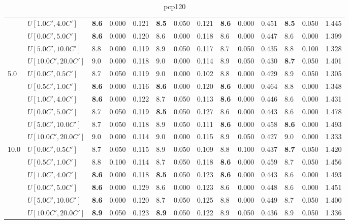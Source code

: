 \begin{table}[h]
{\begin{tabular}{|l|l||l|l|l||l|l|l||l|l|l||l|l|l|}
       & $U[1.0C',4.0C']$ & \textbf{8.6} & 0.000 & 0.121 & \textbf{8.5} & 0.050 & 0.121 & \textbf{8.6} & 0.000 & 0.451 & \textbf{8.5} & 0.050 & 1.445 \\
       & $U[0.0C',5.0C']$ & \textbf{8.6} & 0.000 & 0.120 & 8.6 & 0.000 & 0.118 & 8.6 & 0.000 & 0.447 & 8.6 & 0.000 & 1.399 \\
       & $U[5.0C',10.0C']$ & 8.8 & 0.000 & 0.119 & 8.9 & 0.050 & 0.117 & 8.7 & 0.050 & 0.435 & 8.8 & 0.100 & 1.328 \\
       & $U[10.0C',20.0C']$ & 9.0 & 0.000 & 0.118 & 9.0 & 0.000 & 0.114 & 8.9 & 0.050 & 0.430 & \textbf{8.7} & 0.050 & 1.401 \\
      \hline\hline
      \multirow{6}{*}{5.0} & $U[0.0C',0.5C']$ & 8.7 & 0.050 & 0.119 & 9.0 & 0.000 & 0.102 & 8.8 & 0.000 & 0.429 & 8.9 & 0.050 & 1.305 \\
       & $U[0.5C',1.0C']$ & \textbf{8.6} & 0.000 & 0.116 & \textbf{8.6} & 0.000 & 0.120 & \textbf{8.6} & 0.000 & 0.464 & 8.8 & 0.000 & 1.348 \\
       & $U[1.0C',4.0C']$ & \textbf{8.6} & 0.000 & 0.122 & 8.7 & 0.050 & 0.113 & \textbf{8.6} & 0.000 & 0.446 & 8.6 & 0.000 & 1.431 \\
       & $U[0.0C',5.0C']$ & 8.7 & 0.050 & 0.119 & \textbf{8.5} & 0.050 & 0.127 & 8.6 & 0.000 & 0.443 & 8.6 & 0.000 & 1.478 \\
       & $U[5.0C',10.0C']$ & 8.7 & 0.050 & 0.118 & 8.9 & 0.050 & 0.111 & \textbf{8.6} & 0.000 & 0.458 & \textbf{8.6} & 0.000 & 1.493 \\
       & $U[10.0C',20.0C']$ & 9.0 & 0.000 & 0.114 & 9.0 & 0.000 & 0.115 & 8.9 & 0.050 & 0.427 & 9.0 & 0.000 & 1.333 \\
      \hline\hline
      \multirow{6}{*}{10.0} & $U[0.0C',0.5C']$ & 8.7 & 0.050 & 0.115 & 8.9 & 0.050 & 0.109 & 8.8 & 0.100 & 0.437 & \textbf{8.7} & 0.050 & 1.420 \\
       & $U[0.5C',1.0C']$ & 8.8 & 0.100 & 0.114 & 8.7 & 0.050 & 0.118 & \textbf{8.6} & 0.000 & 0.459 & 8.7 & 0.050 & 1.456 \\
       & $U[1.0C',4.0C']$ & \textbf{8.6} & 0.000 & 0.118 & \textbf{8.5} & 0.050 & 0.123 & \textbf{8.6} & 0.000 & 0.443 & 8.6 & 0.000 & 1.493 \\
       & $U[0.0C',5.0C']$ & \textbf{8.6} & 0.000 & 0.129 & 8.6 & 0.000 & 0.123 & 8.6 & 0.000 & 0.448 & 8.6 & 0.000 & 1.451 \\
       & $U[5.0C',10.0C']$ & \textbf{8.6} & 0.000 & 0.120 & 8.7 & 0.050 & 0.125 & 8.8 & 0.000 & 0.449 & 8.7 & 0.050 & 1.400 \\
       & $U[10.0C',20.0C']$ & \textbf{8.9} & 0.050 & 0.123 & \textbf{8.9} & 0.050 & 0.122 & 8.9 & 0.050 & 0.436 & 8.9 & 0.050 & 1.336 \\
      \hline
      \end{tabular}
      }
      \caption{pcp120}
      \label{tab:pcp120}\end{table}
\clearpage

